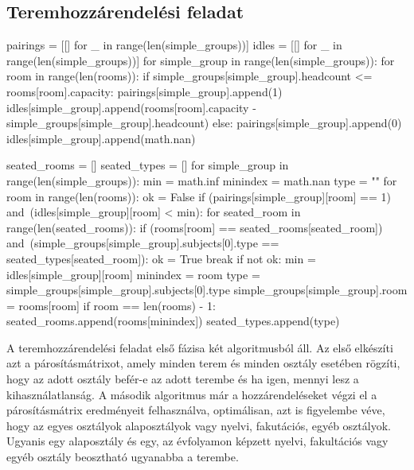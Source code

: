 \subsection{Teremhozzárendelési feladat}

\begin{python}
pairings = [[] for _ in range(len(simple_groups))]
idles = [[] for _ in range(len(simple_groups))]
for simple_group in range(len(simple_groups)):
    for room in range(len(rooms)):
        if simple_groups[simple_group].headcount <= rooms[room].capacity:
            pairings[simple_group].append(1)
            idles[simple_group].append(rooms[room].capacity -
            simple_groups[simple_group].headcount)
        else:
            pairings[simple_group].append(0)
            idles[simple_group].append(math.nan)

seated_rooms = []
seated_types = []
for simple_group in range(len(simple_groups)):
    min = math.inf
    minindex = math.nan
    type = ""
    for room in range(len(rooms)):
        ok = False
        if (pairings[simple_group][room] == 1) and\
           (idles[simple_group][room] < min):
            for seated_room in range(len(seated_rooms)):
                if (rooms[room] == seated_rooms[seated_room]) and\
                   (simple_groups[simple_group].subjects[0].type ==
                    seated_types[seated_room]):
                    ok = True
                    break
            if not ok:
                min = idles[simple_group][room]
                minindex = room
                type = simple_groups[simple_group].subjects[0].type
                simple_groups[simple_group].room = rooms[room]
        if room == len(rooms) - 1:
            seated_rooms.append(rooms[minindex])
            seated_types.append(type)
\end{python}

A teremhozzárendelési feladat első fázisa két algoritmusból áll. Az első elkészíti azt a párosításmátrixot, amely minden terem és minden osztály esetében rögzíti, hogy az adott osztály befér-e az adott terembe és ha igen, mennyi lesz a kihasználatlanság. A második algoritmus már a hozzárendeléseket végzi el a párosításmátrix eredményeit felhasználva, optimálisan, azt is figyelembe véve, hogy az egyes osztályok alaposztályok vagy nyelvi, fakutációs, egyéb osztályok. Ugyanis egy alaposztály és egy, az évfolyamon képzett nyelvi, fakultációs vagy egyéb osztály beosztható ugyanabba a terembe.

